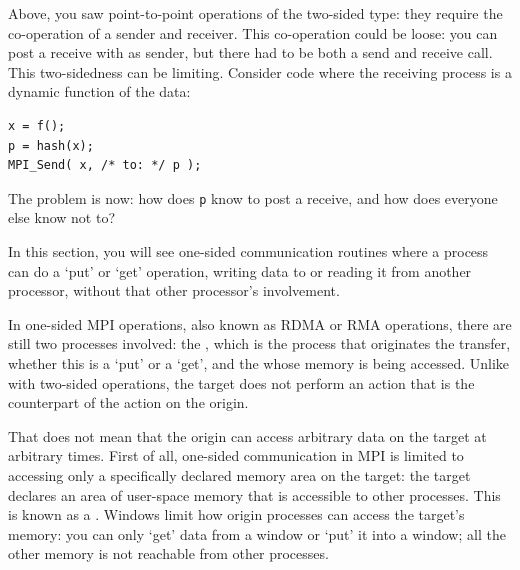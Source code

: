 

Above, you saw  point-to-point operations of the two-sided type:
they require the co-operation of a sender and
receiver. This co-operation could be loose: you can post a receive
with  as sender, but there had to be both a send and
receive call. This two-sidedness can be limiting. Consider code where the receiving
process is a dynamic function of the data:
\begin{lstlisting}
x = f();
p = hash(x);
MPI_Send( x, /* to: */ p );
\end{lstlisting}
The problem is now: how does \lstinline{p} know to post a receive,
and how does everyone else know not to?

In this section, you will see one-sided communication 
routines where a process
can do a `put' or `get' operation, writing data to or reading it from
another processor, without that other processor's involvement.

In one-sided MPI operations, also known as \acf{RDMA} or 
\acf{RMA} operations, there
are still two processes involved: the , which is the
process that originates the transfer, whether this is a `put' or a `get',
and the  whose
memory is being accessed. Unlike with two-sided operations, the target
does not perform an action that is the counterpart of the action on the origin.

That does not mean that the origin can access arbitrary data on the target
at arbitrary times. First of all, one-sided communication in MPI
is limited to accessing only a specifically declared memory area on the target:
the target declares an area of
user-space memory that is accessible to other processes. This is known
as a . Windows limit how origin processes can access
the target's memory: you can only `get' data from a window or `put' it
into a window; all the other memory is not reachable from other processes.

